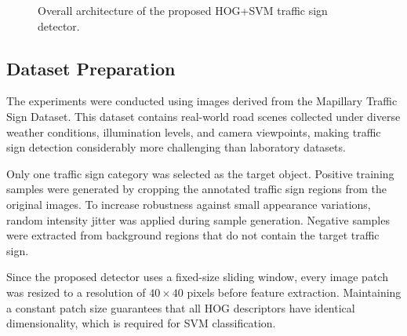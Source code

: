\documentclass[11pt,a4paper,twoside]{article}
\begin{document}
\begin{figure}[ht]
\centering
{}
\caption{Overall architecture of the proposed HOG+SVM traffic sign detector.}
\label{fig:pipeline}
\end{figure}

\subsection{Dataset Preparation}

The experiments were conducted using images derived from the Mapillary Traffic Sign Dataset. This dataset contains real-world road scenes collected under diverse weather conditions, illumination levels, and camera viewpoints, making traffic sign detection considerably more challenging than laboratory datasets.

Only one traffic sign category was selected as the target object. Positive training samples were generated by cropping the annotated traffic sign regions from the original images. To increase robustness against small appearance variations, random intensity jitter was applied during sample generation. Negative samples were extracted from background regions that do not contain the target traffic sign.

Since the proposed detector uses a fixed-size sliding window, every image patch was resized to a resolution of $40\times40$ pixels before feature extraction. Maintaining a constant patch size guarantees that all HOG descriptors have identical dimensionality, which is required for SVM classification.
\end{document}
